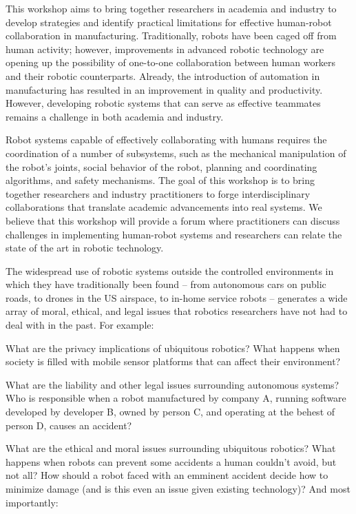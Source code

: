 \begin{spacing}{1.0}
{
This workshop aims to bring together researchers in academia and industry to develop strategies and identify practical limitations for effective human-robot collaboration in manufacturing. Traditionally, robots have been caged off from human activity; however, improvements in advanced robotic technology are opening up the possibility of one-to-one collaboration between human workers and their robotic counterparts. Already, the introduction of automation in manufacturing has resulted in an improvement in quality and productivity. However, developing robotic systems that can serve as effective teammates remains a challenge in both academia and industry.

Robot systems capable of effectively collaborating with humans requires the coordination of a number of subsystems, such as the mechanical manipulation of the robot’s joints, social behavior of the robot, planning and coordinating algorithms, and safety mechanisms. The goal of this workshop is to bring together researchers and industry practitioners to forge interdisciplinary collaborations that translate academic advancements into real systems. We believe that this workshop will provide a forum where practitioners can discuss challenges in implementing human-robot systems and researchers can relate the state of the art in robotic technology.
}


{
The widespread use of robotic systems outside the controlled environments in which they have traditionally been found – from autonomous cars on public roads, to drones in the US airspace, to in-home service robots – generates a wide array of moral, ethical, and legal issues that robotics researchers have not had to deal with in the past. For example:

What are the privacy implications of ubiquitous robotics? What happens when society is filled with mobile sensor platforms that can affect their environment?

What are the liability and other legal issues surrounding autonomous systems? Who is responsible when a robot manufactured by company A, running software developed by developer B, owned by person C, and operating at the behest of person D, causes an accident?

What are the ethical and moral issues surrounding ubiquitous robotics? What happens when robots can prevent some accidents a human couldn't avoid, but not all? How should a robot faced with an emminent accident decide how to minimize damage (and is this even an issue given existing technology)? And most importantly:

}
\end{spacing}
